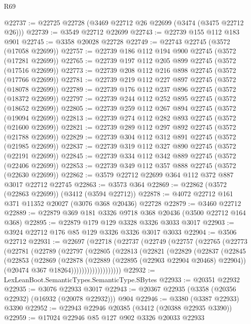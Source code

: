 \begin{lexlean}{R69}
\begin{coremodule}
@22737 := @22725 @22728 (@3469 @22712 @26 @22699 (@3474 (@3475 @22712 @26)))
@22739 := @3549 @22712 @22699
@22743 := @22739 @155 @112 @183 @901
@22745 := @3358 @20028 @22728
@22749 := @22743 @22745 (@3572 (@17058 @22699))
@22757 := @22739 @186 @112 @194 @900 @22745 (@3572 (@17281 @22699))
@22765 := @22739 @197 @112 @205 @899 @22745 (@3572 (@17516 @22699))
@22773 := @22739 @208 @112 @216 @898 @22745 (@3572 (@17766 @22699))
@22781 := @22739 @219 @112 @227 @897 @22745 (@3572 (@18078 @22699))
@22789 := @22739 @176 @112 @237 @896 @22745 (@3572 (@18372 @22699))
@22797 := @22739 @244 @112 @252 @895 @22745 (@3572 (@18652 @22699))
@22805 := @22739 @259 @112 @267 @894 @22745 (@3572 (@19094 @22699))
@22813 := @22739 @274 @112 @282 @893 @22745 (@3572 (@21600 @22699))
@22821 := @22739 @289 @112 @297 @892 @22745 (@3572 (@21788 @22699))
@22829 := @22739 @304 @112 @312 @891 @22745 (@3572 (@21985 @22699))
@22837 := @22739 @319 @112 @327 @890 @22745 (@3572 (@22191 @22699))
@22845 := @22739 @334 @112 @342 @889 @22745 (@3572 (@22406 @22699))
@22853 := @22739 @349 @112 @357 @888 @22745 (@3572 (@22630 @22699))
@22862 := @3579 @22712 @22699 @364 @112 @372 @887 @3017 @22712 @22745
@22863 := @3573 @364
@22869 := @22862 (@3572 (@22863 @22699)) (@3412 (@3594 @22712))
@22878 := @4072 @22712 @161 @371 @11352 @20027 (@3076 @368 @20436) @22728
@22879 := @3460 @22712
@22889 := @22879 @369 @181 @3326 @9718 @368 @20436 (@3500 @22712 @164 @368)
@22895 := @22879 @179 @129 @3328 @3326 @3033 @3017
@22903 := @3924 @22712 @176 @85 @129 @3326 @3326 @3017 @3033
@22904 := @3506 @22712
@22931 := @22697
    (@22718
      (@22737
        (@22749
          (@22757
            (@22765
              (@22773
                (@22781
                  (@22789
                    (@22797
                      (@22805
                        (@22813
                          (@22821
                            (@22829
                              (@22837
                                (@22845
                                  (@22853
                                    (@22869
                                      (@22878
                                        (@22889 (@22895 (@22903 @22904 @20468) @22904))
                                        (@20474 @367 @18264)))))))))))))))))))
@22932 := LexLeanBoot.SemanticTypes.SemanticType.SBytes
@22933 := @20351 @22932
@22935 := @3076 @22933 @3017
@22943 := @20367 @22935 (@3358 (@20356 @22932) (@16932 (@20078 @22932))) @904
@22946 := @3380 (@3387 @22933) @3390
@22952 := @22943 @22946 @20385 (@3412 (@20388 @22935 @3390))
@22959 := @17024 @22946 @85 @127 @902 @3326 @20033 @22933

\end{coremodule}
\end{lexlean}
